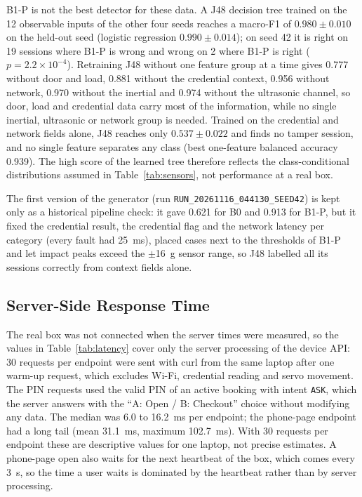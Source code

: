 \documentclass[journal,onecolumn]{IEEEtran}
\begin{document}
B1-P is not the best detector for these data. A J48 decision tree trained on the 12 observable inputs of the other four
seeds reaches a macro-F1 of $0.980\pm0.010$ on the held-out seed (logistic regression $0.990\pm0.014$); on seed 42 it
is right on 19 sessions where B1-P is wrong and wrong on 2 where B1-P is right ($p=2.2\times10^{-4}$). Retraining J48
without one feature group at a time gives 0.777 without door and load, 0.881 without the credential context, 0.956
without network, 0.970 without the inertial and 0.974 without the ultrasonic channel, so door, load and credential
data carry most of the information, while no single inertial, ultrasonic or network group is needed. Trained on the
credential and network fields alone, J48 reaches only $0.537\pm0.022$ and finds no tamper session, and no single
feature separates any class (best one-feature balanced accuracy 0.939). The high score of the learned tree therefore
reflects the class-conditional distributions assumed in Table~\ref{tab:sensors}, not performance at a real box.

The first version of the generator (run \texttt{RUN\_20261116\_044130\_SEED42}) is kept only as a historical pipeline
check: it gave 0.621 for B0 and 0.913 for B1-P, but it fixed the credential result, the credential flag and the
network latency per category (every fault had 25~ms), placed cases next to the thresholds of B1-P and let impact peaks
exceed the $\pm$16~g sensor range, so J48 labelled all its sessions correctly from context fields alone.

\subsection{Server-Side Response Time}
\label{sec:latency}

The real box was not connected when the server times were measured, so the values in Table~\ref{tab:latency} cover
only the server processing of the device API: 30 requests per endpoint were sent with curl from the same laptop after
one warm-up request, which excludes Wi-Fi, credential reading and servo movement. The PIN requests used the valid PIN
of an active booking with intent \texttt{ASK}, which the server answers with the ``A: Open / B: Checkout'' choice without
modifying any data. The median was 6.0 to 16.2~ms per endpoint; the phone-page endpoint had a long tail (mean
31.1~ms, maximum 102.7~ms). With 30 requests per endpoint these are descriptive values for one laptop, not precise
estimates. A phone-page open also waits for the next heartbeat of the box, which comes every 3~s, so the time a user
waits is dominated by the heartbeat rather than by server processing.
\end{document}

